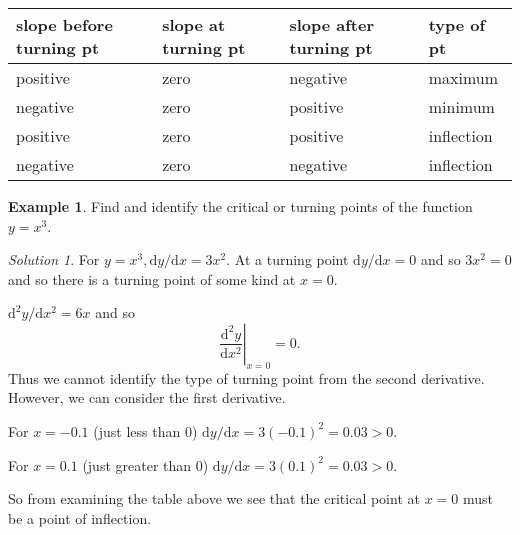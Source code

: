 \documentclass[
  english,
  11pt,
  oneside]{book}
\newcommand{\slide}{}
\theoremstyle{definition}
\theoremstyle{definition}
\newtheorem{example}{Example}[chapter]
\theoremstyle{definition}
\theoremstyle{definition}
\theoremstyle{remark}
\newtheorem*{solution}{Solution}
\begin{document}
\begin{longtable}[]{@{}
  >{\raggedright\arraybackslash}p{}
  >{\raggedright\arraybackslash}p{}
  >{\raggedright\arraybackslash}p{}
  >{\raggedright\arraybackslash}p{}@{}}
\toprule\noalign{}
\begin{minipage}[b]{\linewidth}\raggedright
slope before turning pt
\end{minipage} & \begin{minipage}[b]{\linewidth}\raggedright
slope at turning pt
\end{minipage} & \begin{minipage}[b]{\linewidth}\raggedright
slope after turning pt
\end{minipage} & \begin{minipage}[b]{\linewidth}\raggedright
type of pt
\end{minipage} \\
\midrule\noalign{}
\endhead
\bottomrule\noalign{}
\endlastfoot
positive & zero & negative & maximum \\
negative & zero & positive & minimum \\
positive & zero & positive & inflection \\
negative & zero & negative & inflection \\
\end{longtable}

\slide

\begin{example}
Find and identify the critical or turning points of the function \(y=x^3\).
\end{example}

\begin{solution}
For \(y=x^3, \mathrm{d}y/\mathrm{d} x = 3x^2\). At a turning point \(\mathrm{d}y/\mathrm{d} x=0\) and so \(3x^2=0\) and so there is a turning point of some kind at \(x=0\).

\(\mathrm{d}^{2}y/\mathrm{d} x^2=6x\) and so
\[
\left.\frac{\mathrm{d}^{2}y}{\mathrm{d} x^2}\right\vert_{x=0} = 0.
\]
Thus we cannot identify the type of turning point from the second derivative.
However, we can consider the first derivative.

For \(x=-0.1\) (just less than \(0\)) \(\mathrm{d}y/\mathrm{d} x = 3(-0.1)^2 = 0.03>0\).

For \(x = 0.1\) (just greater than \(0\)) \(\mathrm{d}y/\mathrm{d} x=3(0.1)^2 = 0.03>0\).

So from examining the table above we see that the critical point at \(x=0\) must be a point of inflection.
\end{solution}
\end{document}
